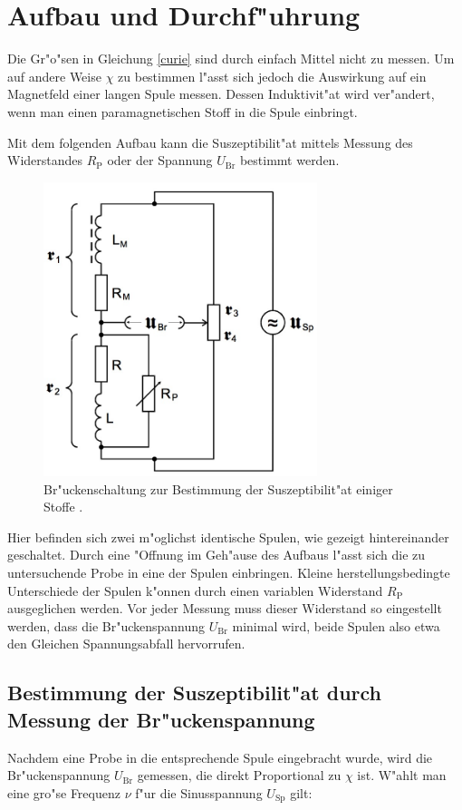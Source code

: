 \section{Aufbau und Durchf"uhrung}
	\label{sec:durchfuehrung}

	Die Gr"o"sen in Gleichung \eqref{curie} sind durch einfach Mittel nicht zu messen.
	Um auf andere Weise $\chi$ zu bestimmen l"asst sich jedoch die Auswirkung auf ein Magnetfeld einer langen Spule messen.
	Dessen Induktivit"at wird ver"andert, wenn man einen paramagnetischen Stoff in die Spule einbringt.

	Mit dem folgenden Aufbau kann die Suszeptibilit"at mittels Messung des Widerstandes $R_\mathrm{P}$ oder der Spannung $U_\mathrm{Br}$ bestimmt werden.

	\begin{figure}[h!]
		\centering
		\includegraphics[width = 8cm]{img/aufbau.JPG}
		\caption{Br"uckenschaltung zur Bestimmung der Suszeptibilit"at einiger Stoffe \cite{anleitung}.}
		\label{fig:brueckenschaltung}
	\end{figure}

	\clearpage

	Hier befinden sich zwei m"oglichst identische Spulen, wie gezeigt hintereinander geschaltet.
	Durch eine "Offnung im Geh"ause des Aufbaus l"asst sich die zu untersuchende Probe in eine der Spulen einbringen.
	Kleine herstellungsbedingte Unterschiede der Spulen k"onnen durch einen variablen Widerstand $R_\mathrm{P}$ ausgeglichen werden.
	Vor jeder Messung muss dieser Widerstand so eingestellt werden, dass die Br"uckenspannung $U_\mathrm{Br}$ minimal wird, beide Spulen also etwa den Gleichen Spannungsabfall hervorrufen.

	\subsection{Bestimmung der Suszeptibilit"at durch Messung der Br"uckenspannung}
		\label{subsec:messung_u}
		Nachdem eine Probe in die entsprechende Spule eingebracht wurde, wird die Br"uckenspannung $U_\mathrm{Br}$ gemessen, die direkt Proportional zu $\chi$ ist.
		W"ahlt man eine gro"se Frequenz $\nu$ f"ur die Sinusspannung $U_\mathrm{Sp}$ gilt:

